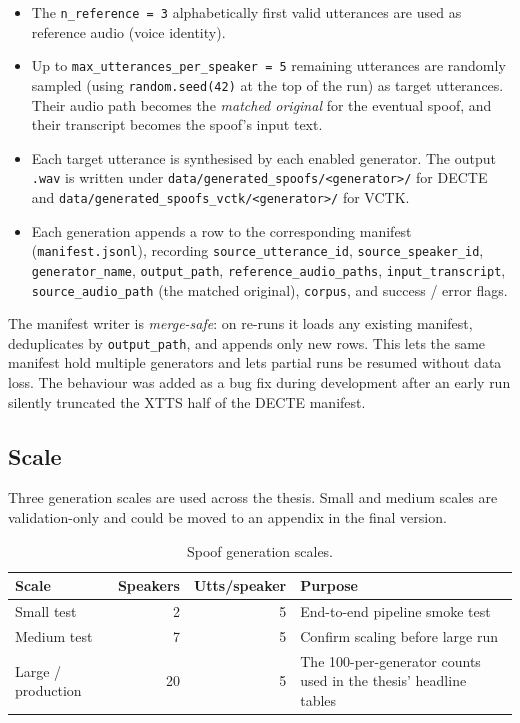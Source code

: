 \begin{itemize}
    \item The \texttt{n\_reference = 3} alphabetically first valid utterances are
        used as reference audio (voice identity).
    \item Up to \texttt{max\_utterances\_per\_speaker = 5} remaining utterances are
        randomly sampled (using \texttt{random.seed(42)} at the top of the run)
        as target utterances. Their audio path becomes the \emph{matched
        original} for the eventual spoof, and their transcript becomes the
        spoof's input text.
    \item Each target utterance is synthesised by each enabled generator.
        The output \texttt{.wav} is written under
        \texttt{data/generated\_spoofs/<generator>/} for DECTE and
        \texttt{data/generated\_spoofs\_vctk/<generator>/} for VCTK.
    \item Each generation appends a row to the corresponding manifest
        (\texttt{manifest.jsonl}), recording \texttt{source\_utterance\_id},
        \texttt{source\_speaker\_id}, \texttt{generator\_name}, \texttt{output\_path},
        \texttt{reference\_audio\_paths}, \texttt{input\_transcript}, \texttt{source\_audio\_path}
        (the matched original), \texttt{corpus}, and success / error flags.
\end{itemize}

The manifest writer is \emph{merge-safe}: on re-runs it loads any
existing manifest, deduplicates by \texttt{output\_path}, and appends
only new rows. This lets the same manifest hold multiple generators
and lets partial runs be resumed without data loss. The behaviour
was added as a bug fix during development after an early run
silently truncated the XTTS half of the DECTE manifest.

\subsection{Scale}
\label{sec:methodology-generators-scale}

Three generation scales are used across the thesis. Small and
medium scales are validation-only and could be moved to an appendix
in the final version.

\begin{table}[t]
\centering
\caption{Spoof generation scales.}
\label{tab:methodology-scale}
\begin{tabularx}{\linewidth}{l r r X}
\toprule
\textbf{Scale} & \textbf{Speakers} & \textbf{Utts/speaker} & \textbf{Purpose} \\
\midrule
Small test         & 2  & 5 & End-to-end pipeline smoke test \\
Medium test        & 7  & 5 & Confirm scaling before large run \\
Large / production & 20 & 5 & The 100-per-generator counts used in the thesis' headline tables \\
\bottomrule
\end{tabularx}
\end{table}

